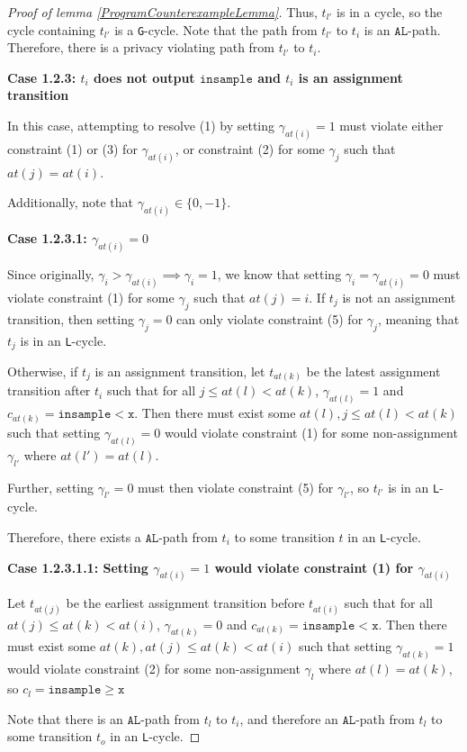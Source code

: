 \documentclass[12pt]{article}
\newcommand{\gguard}[1][x]{\texttt{insample}\geq#1}
\newcommand{\lguard}[1][x]{\texttt{insample} < #1}
\newcommand{\gcycle}{\texttt{G}-cycle}
\newcommand{\lcycle}{\texttt{L}-cycle}
\theoremstyle{definition}
\begin{document}
\begin{proof}[Proof of lemma \ref{ProgramCounterexampleLemma}]
    Thus, $t_{l'}$ is in a cycle, so the cycle containing $t_{l'}$ is a \gcycle. Note that the path from $t_{l'}$ to $t_i$ is an $\texttt{AL}$-path. Therefore, there is a privacy violating path from $t_{l'}$ to $t_i$.

    \textbf{Case 1.2.3: $t_i$ does not output $\texttt{insample}$ and $t_i$ is an assignment transition}

    In this case, attempting to resolve (1) by setting $\gamma_{at(i)} = 1$ must violate either constraint (1) or (3) for $\gamma_{at(i)}$, or constraint (2) for some $\gamma_j$ such that $at(j) = at(i)$. 

    Additionally, note that $\gamma_{at(i)} \in \{0, -1\}$. 

    \textbf{Case 1.2.3.1: $\gamma_{at(i)} =0$}

    Since originally, $\gamma_i > \gamma_{at(i)} \implies \gamma_i = 1$, we know that setting $\gamma_i = \gamma_{at(i)} = 0$ must violate constraint (1) for some $\gamma_j$ such that $at(j) = i$. If $t_{j}$ is not an assignment transition, then setting $\gamma_{j} = 0$ can only violate constraint (5) for $\gamma_{j}$, meaning that $t_j$ is in an \lcycle.

    Otherwise, if $t_j$ is an assignment transition, let $t_{at(k)}$ be the latest assignment transition after $t_{i}$ such that for all $j\leq at(l)< at(k)$, $\gamma_{at(l)} =1$ and $c_{at(k)} = \lguard[\texttt{x}]$. Then there must exist some $at(l), j\leq at(l)< at(k)$ such that setting $\gamma_{at(l)}=0$ would violate constraint (1) for some non-assignment $\gamma_{l'}$ where $at(l') = at(l)$. 

    Further, setting $\gamma_{l'} = 0$ must then violate constraint (5) for $\gamma_{l'}$, so $t_{l'}$ is in an \lcycle. 

    Therefore, there exists a $\texttt{AL}$-path from $t_i$ to some transition $t$ in an \lcycle. 

    \textbf{Case 1.2.3.1.1: Setting $\gamma_{at(i)} = 1$ would violate constraint (1) for $\gamma_{at(i)}$}

    Let $t_{at(j)}$ be the earliest assignment transition before $t_{at(i)}$ such that for all $at(j)\leq at(k)< at(i)$, $\gamma_{at(k)} =0$ and $c_{at(k)} = \lguard[\texttt{x}]$. Then there must exist some $at(k), at(j)\leq at(k)< at(i)$ such that setting $\gamma_{at(k)}=1$ would violate constraint (2) for some non-assignment $\gamma_l$ where $at(l) = at(k)$, so $c_l = \gguard[\texttt{x}]$

    Note that there is an $\texttt{AL}$-path from $t_l$ to $t_i$, and therefore an $\texttt{AL}$-path from $t_l$ to some transition $t_{o}$ in an \lcycle. 


\end{proof}
\end{document}

